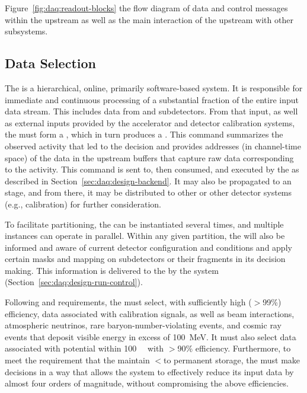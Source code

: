Figure~\ref{fig:daq:readout-blocks} 
the flow diagram of data and control messages within the upstream  
as well as the main interaction of the upstream  with other subsystems.

\subsection{Data Selection}
\label{sec:daq:design-data-selection}

The   is a hierarchical, online, primarily
software-based system. It is responsible for immediate and continuous processing of a substantial fraction of the entire input data stream. 
This includes data from 
%
 and  subdetectors.
%
From that input, as well as external inputs provided by
the accelerator and detector calibration systems, the  must form a ,
which in turn produces a .
This command summarizes the observed activity that led to the decision
and provides addresses (in channel-time space) of the data in the
upstream  buffers that capture raw data
corresponding to the activity.
This command is sent to, then consumed, and executed by the  as described in Section~\ref{sec:daq:design-backend}. 
It may also be propagated to an  stage, and from there, it may be
distributed to other  or other detector systems
(e.g., calibration) for further consideration.

To facilitate partitioning, the   can be instantiated several times, 
and multiple instances can operate in parallel. Within any
given partition, the  will also be
informed and aware of current detector configuration and conditions and
apply certain masks and mapping on subdetectors or their fragments in
its decision making. This information is delivered to the
 by the  system (Section~\ref{sec:daq:design-run-control}).

Following   and  requirements, the
 must select, with sufficiently high ($>$99\%) efficiency, data associated with calibration
signals, as well as beam interactions,
atmospheric neutrinos, rare baryon-number-violating events, and cosmic
ray events that deposit visible energy in excess of \SI{100}{\MeV}. 
It must also select data associated with potential
 within \SI{100}{\kilo\parsec} with $>$90\% efficiency. 
Furthermore, to meet the requirement that the   maintain
$<$\offsitepbpy to permanent storage, the 
must make  decisions in a way that allows the  
system to effectively reduce its input data by almost four orders of magnitude,
without compromising the above efficiencies.

